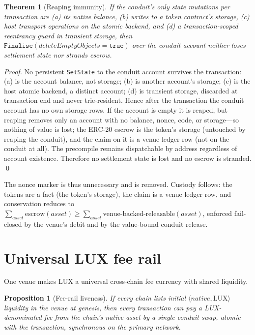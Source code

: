 \documentclass[11pt,a4paper]{article}
\newtheorem{theorem}{Theorem}[section]
\newtheorem{proposition}{Proposition}[section]
\begin{document}
\begin{theorem}[Reaping immunity]\label{thm:reap}
If the conduit's only state mutations per transaction are (a) its native balance, (b) writes to a
token contract's storage, (c) host transport operations on the atomic backend, and (d) a
transaction-scoped reentrancy guard in transient storage, then
$\texttt{Finalise}(\mathit{deleteEmptyObjects}=\texttt{true})$ over the conduit account neither
loses settlement state nor strands escrow.
\end{theorem}

\begin{proof}
No persistent \texttt{SetState} to the conduit account survives the transaction: (a) is the account
balance, not storage; (b) is another account's storage; (c) is the host atomic backend, a distinct
account; (d) is transient storage, discarded at transaction end and never trie-resident. Hence after
the transaction the conduit account has no own storage rows. If the account is empty it is reaped,
but reaping removes only an account with no balance, nonce, code, or storage---so nothing of value
is lost; the ERC-20 escrow is the token's storage (untouched by reaping the conduit), and the
claim on it is a venue ledger row (not on the conduit at all). The precompile remains dispatchable
by address regardless of account existence. Therefore no settlement state is lost and no escrow is
stranded. \qed
\end{proof}

The nonce marker is thus unnecessary and is removed. Custody follows: the tokens are a fact (the
token's storage), the claim is a venue ledger row, and conservation reduces to
$\sum_{\mathit{asset}} \mathrm{escrow}(\mathit{asset}) \geq \sum_{\mathit{asset}}
\mathrm{venue\text{-}backed\text{-}releasable}(\mathit{asset})$, enforced fail-closed by the venue's
debit and by the value-bound conduit release.

\section{Universal LUX fee rail}
\label{sec:fee}

One venue makes LUX a universal cross-chain fee currency with shared liquidity.

\begin{proposition}[Fee-rail liveness]\label{prop:fee}
If every chain lists initial $\langle \mathit{native}, \mathrm{LUX}\rangle$ liquidity in the venue
at genesis, then every transaction can pay a LUX-denominated fee from the chain's native asset by a
single conduit swap, atomic with the transaction, synchronous on the primary network.
\end{proposition}
\end{document}
